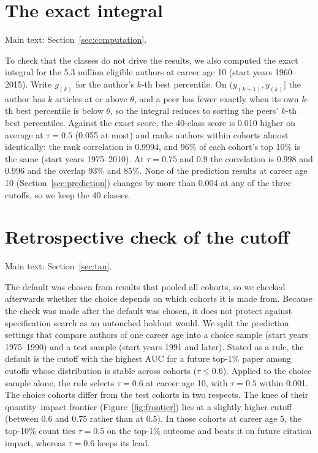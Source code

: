 \documentclass[11pt]{article}
\begin{document}
\section{The exact integral}
\label{supp:exact}
\noindent Main text: Section~\ref{sec:computation}.\par\nopagebreak

To check that the classes do not drive the results, we also computed the exact integral for the 5.3 million eligible
authors at career age 10 (start years 1960--2015). Write $y_{(k)}$ for the author's $k$-th best percentile. On
$(y_{(k+1)}, y_{(k)}]$ the author has $k$ articles at or above $\theta$, and a peer has fewer exactly when its own
$k$-th best percentile is below $\theta$, so the integral reduces to sorting the peers' $k$-th best percentiles.
Against the exact score, the 40-class score is 0.010 higher on average at $\tau = 0.5$ (0.055 at most) and ranks
authors within cohorts almost identically: the rank correlation is 0.9994, and 96\% of each cohort's top 10\% is the
same (start years 1975--2010). At $\tau = 0.75$ and $0.9$ the correlation is 0.998 and 0.996 and the overlap 93\% and
85\%. None of the prediction results at career age 10 (Section~\ref{sec:prediction}) changes by more than 0.004 at any
of the three cutoffs, so we keep the 40 classes.

\section{Retrospective check of the cutoff}
\label{supp:holdout}
\noindent Main text: Section~\ref{sec:tau}.\par\nopagebreak

The default was chosen from results that pooled all cohorts, so we
checked afterwards whether the choice depends on which cohorts it is made from. Because the check was made after the
default was chosen, it does not protect against specification search as an untouched holdout would. We split the
prediction settings that compare authors of one career age into a choice sample (start years 1975--1990) and a test
sample (start years 1991 and later). Stated as a rule, the default is the cutoff with the highest AUC for a future
top-1\% paper among cutoffs whose distribution is stable across cohorts ($\tau \le 0.6$). Applied to the choice sample
alone, the rule selects $\tau = 0.6$ at career age 10, with $\tau = 0.5$ within 0.001. The choice cohorts differ from
the test cohorts in two respects. The knee of their quantity--impact frontier (Figure~\ref{fig:frontier}) lies at a
slightly higher cutoff (between 0.6 and 0.75 rather than at 0.5). In those cohorts at career age 5, the top-10\% count
ties $\tau = 0.5$ on the top-1\% outcome and beats it on future citation impact, whereas $\tau = 0.6$ keeps its lead.
\end{document}

